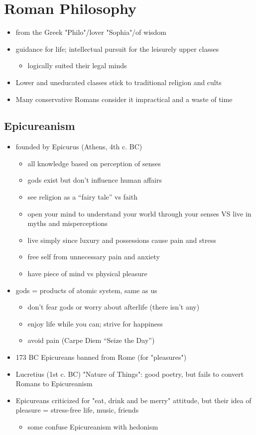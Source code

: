 \documentclass[12pt, twoside]{article}
\begin{document}
\section{Roman Philosophy}
\begin{itemize}
\item from the Greek "Philo"/lover "Sophia"/of wisdom
\item guidance for life; intellectual pursuit for the leisurely upper classes
	\begin{itemize}
	\item logically suited their legal minds
	\end{itemize}
\item Lower and uneducated classes stick to traditional religion and cults
\item Many conservative Romans consider it impractical and a waste of time
\end{itemize}

\subsection{Epicureanism}
\begin{itemize}
\item founded by Epicurus (Athens, 4th c. BC)
	\begin{itemize}
	\item all knowledge based on perception of senses
	\item gods exist but don't influence human affairs
	\item see religion as a “fairy tale” vs faith
	\item open your mind to understand your world through your senses VS live in myths and misperceptions
	\item live simply since luxury and possessions cause pain and stress
	\item free self from unnecessary pain and anxiety
	\item have piece of mind vs physical pleasure
	\end{itemize}
\item gods = products of atomic system, same as us
	\begin{itemize}
	\item don't fear gods or worry about afterlife (there isn't any)
	\item enjoy life while you can; strive for happiness
	\item avoid pain (Carpe Diem “Seize the Day”)
	\end{itemize}
\item 173 BC Epicureans banned from Rome (for "pleasures")
\item Lucretius (1st c. BC) "Nature of Things": good poetry, but fails to convert Romans to Epicureanism
\item Epicureans criticized for "eat, drink and be merry" attitude, but their idea of pleasure = stress-free life, music, friends
	\begin{itemize}
	\item some confuse Epicureanism with hedonism
	\end{itemize}
\end{itemize}
\end{document}
